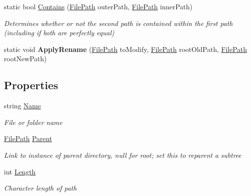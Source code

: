 \begin{DoxyCompactItemize}
\item 
static bool \hyperlink{class_cloud_api_public_1_1_model_1_1_file_path_ab3a9513bde83e7c917d385269d421bd4}{Contains} (\hyperlink{class_cloud_api_public_1_1_model_1_1_file_path}{File\-Path} outer\-Path, \hyperlink{class_cloud_api_public_1_1_model_1_1_file_path}{File\-Path} inner\-Path)
\begin{DoxyCompactList}\small\item\em Determines whether or not the second path is contained within the first path (including if both are perfectly equal) \end{DoxyCompactList}\item 
\hypertarget{class_cloud_api_public_1_1_model_1_1_file_path_ac899f6153fd260eec0386a7e141a7896}{static void {\bfseries Apply\-Rename} (\hyperlink{class_cloud_api_public_1_1_model_1_1_file_path}{File\-Path} to\-Modify, \hyperlink{class_cloud_api_public_1_1_model_1_1_file_path}{File\-Path} root\-Old\-Path, \hyperlink{class_cloud_api_public_1_1_model_1_1_file_path}{File\-Path} root\-New\-Path)}\label{class_cloud_api_public_1_1_model_1_1_file_path_ac899f6153fd260eec0386a7e141a7896}

\end{DoxyCompactItemize}
\subsection*{Properties}
\begin{DoxyCompactItemize}
\item 
string \hyperlink{class_cloud_api_public_1_1_model_1_1_file_path_a02285f24ec2d49c85778d6b5a251aa7b}{Name}
\begin{DoxyCompactList}\small\item\em File or folder name \end{DoxyCompactList}\item 
\hyperlink{class_cloud_api_public_1_1_model_1_1_file_path}{File\-Path} \hyperlink{class_cloud_api_public_1_1_model_1_1_file_path_a4c3e4582847856e2a49370fb421d4c70}{Parent}
\begin{DoxyCompactList}\small\item\em Link to instance of parent directory, null for root; set this to reparent a subtree \end{DoxyCompactList}\item 
int \hyperlink{class_cloud_api_public_1_1_model_1_1_file_path_a6e415515bb70328b0ac881f9703be2c2}{Length}
\begin{DoxyCompactList}\small\item\em Character length of path \end{DoxyCompactList}\end{DoxyCompactItemize}


